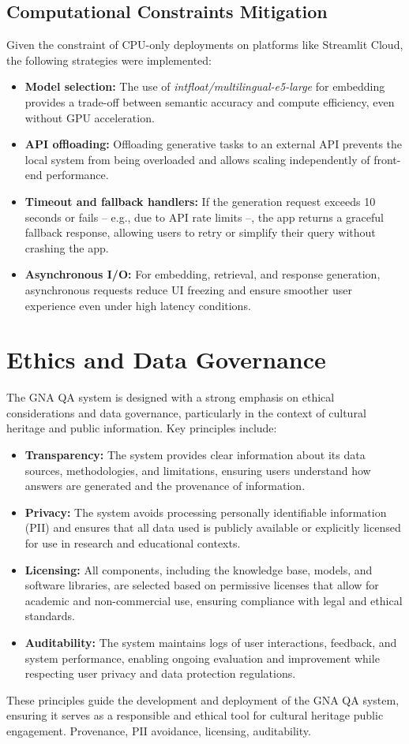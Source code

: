 \begin{spacing}{1.5}
\subsection{Computational Constraints Mitigation}
Given the constraint of CPU-only deployments on platforms like Streamlit Cloud, the following strategies were implemented:
\begin{itemize}
\item \textbf{Model selection:} The use of \textit{intfloat/multilingual-e5-large} for embedding provides a trade-off between semantic accuracy and compute efficiency, even without GPU acceleration.
\item \textbf{API offloading:} Offloading generative tasks to an external API prevents the local system from being overloaded and allows scaling independently of front-end performance.
\item \textbf{Timeout and fallback handlers:} If the generation request exceeds 10 seconds or fails -- e.g., due to API rate limits --, the app returns a graceful fallback response, allowing users to retry or simplify their query without crashing the app.
\item \textbf{Asynchronous I/O:} For embedding, retrieval, and response generation, asynchronous requests reduce UI freezing and ensure smoother user experience even under high latency conditions.
\end{itemize}


\section{Ethics and Data Governance}
The GNA QA system is designed with a strong emphasis on ethical considerations and data governance, particularly in the context of cultural heritage and public information. Key principles include:
\begin{itemize}
\item \textbf{Transparency:} The system provides clear information about its data sources, methodologies, and limitations, ensuring users understand how answers are generated and the provenance of information.
\item \textbf{Privacy:} The system avoids processing personally identifiable information (PII) and ensures that all data used is publicly available or explicitly licensed for use in research and educational contexts.
\item \textbf{Licensing:} All components, including the knowledge base, models, and software libraries, are selected based on permissive licenses that allow for academic and non-commercial use, ensuring compliance with legal and ethical standards.
\item \textbf{Auditability:} The system maintains logs of user interactions, feedback, and system performance, enabling ongoing evaluation and improvement while respecting user privacy and data protection regulations.
\end{itemize}
These principles guide the development and deployment of the GNA QA system, ensuring it serves as a responsible and ethical tool for cultural heritage public engagement.
Provenance, PII avoidance, licensing, auditability.


\end{spacing}

